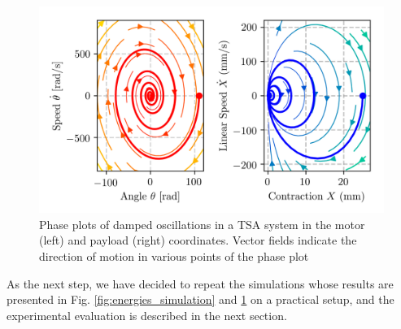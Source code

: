 \begin{figure}
		\centering
		\includegraphics[trim= 0.0cm 0.8cm 0.0cm 0.0cm,width=1.0\columnwidth]{pics/plots/phase_space_model.png}
		\caption{Phase plots of damped oscillations in a TSA system in the motor (left) and payload (right) coordinates. Vector fields indicate the direction of motion in various points of the phase plot}
 		\label{fig:phase_plots_simulation}
		\vspace*{-2mm} 
\end{figure}

As the next step, we have decided to repeat the simulations whose results are presented in Fig. \ref{fig:energies_simulation} and \ref{fig:phase_plots_simulation} on a practical setup, and the experimental evaluation is described in the next section. 



